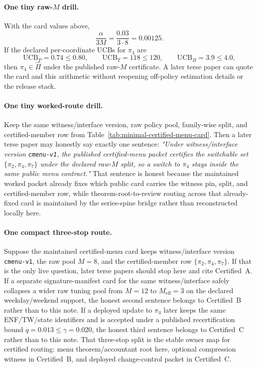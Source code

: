 \documentclass[11pt]{article}
\begin{document}
\paragraph{One tiny raw-$M$ drill.}
With the card values above,
\[
\frac{\alpha}{3M}=\frac{0.03}{3\cdot 8}=0.00125.
\]
If the declared per-coordinate UCBs for $\pi_4$ are
\[
\mathrm{UCB}_P=0.74\le 0.80,\qquad \mathrm{UCB}_T=118\le 120,\qquad \mathrm{UCB}_B=3.9\le 4.0,
\]
then $\pi_4\in\widehat\Pi$ under the published raw-$M$ certificate.
A later terse paper can quote the card and this arithmetic without reopening off-policy estimation details or the release stack.

\paragraph{One tiny worked-route drill.}
Keep the same witness/interface version, raw policy pool, family-wise split, and certified-member row from Table~\ref{tab:minimal-certified-menu-card}.
Then a later terse paper may honestly say exactly one sentence: \emph{"Under witness/interface version \texttt{cmenu-v1}, the published certified-menu packet certifies the switchable set $\{\pi_2,\pi_4,\pi_7\}$ under the declared raw-$M$ split, so a switch to $\pi_4$ stays inside the same public menu contract."}
That sentence is honest because the maintained worked packet already fixes which public card carries the witness pin, split, and certified-member row, while theorem-root-to-review routing across that already-fixed card is maintained by the series-spine bridge rather than reconstructed locally here.\cite{series:workedexample,series:seriesspines}

\paragraph{One compact three-stop route.}
Suppose the maintained certified-menu card keeps witness/interface version \texttt{cmenu-v1}, the raw pool $M=8$, and the certified-member row $\{\pi_2,\pi_4,\pi_7\}$.
If that is the only live question, later terse papers should stop here and cite Certified~A.
If a separate signature-manifest card for the same witness/interface safely collapses a wider raw tuning pool from $M=12$ to $M_{\mathrm{eff}}=3$ on the declared weekday/weekend support, the honest second sentence belongs to Certified~B rather than to this note.
If a deployed update to $\pi_4$ later keeps the same ENF/TW/state identifiers and is accepted under a published recertification bound $\overline q=0.013\le \gamma=0.020$, the honest third sentence belongs to Certified~C rather than to this note.
That three-stop split is the stable owner map for certified routing: menu theorem/accountant root here, optional compression witness in Certified~B, and deployed change-control packet in Certified~C.\cite{series:sigcomp,series:recert}
\end{document}
